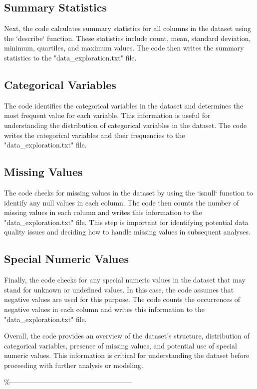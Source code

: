 \documentclass[11pt]{article}
\begin{document}
\subsection{Summary Statistics}
Next, the code calculates summary statistics for all columns in the dataset using the `describe` function. These statistics include count, mean, standard deviation, minimum, quartiles, and maximum values. The code then writes the summary statistics to the "data\_exploration.txt" file.

\subsection{Categorical Variables}
The code identifies the categorical variables in the dataset and determines the most frequent value for each variable. This information is useful for understanding the distribution of categorical variables in the dataset. The code writes the categorical variables and their frequencies to the "data\_exploration.txt" file.

\subsection{Missing Values}
The code checks for missing values in the dataset by using the `isnull` function to identify any null values in each column. The code then counts the number of missing values in each column and writes this information to the "data\_exploration.txt" file. This step is important for identifying potential data quality issues and deciding how to handle missing values in subsequent analyses.

\subsection{Special Numeric Values}
Finally, the code checks for any special numeric values in the dataset that may stand for unknown or undefined values. In this case, the code assumes that negative values are used for this purpose. The code counts the occurrences of negative values in each column and writes this information to the "data\_exploration.txt" file.

Overall, the code provides an overview of the dataset's structure, distribution of categorical variables, presence of missing values, and potential use of special numeric values. This information is critical for understanding the dataset before proceeding with further analysis or modeling.

\%-----------------------------------------------------
\end{document}
